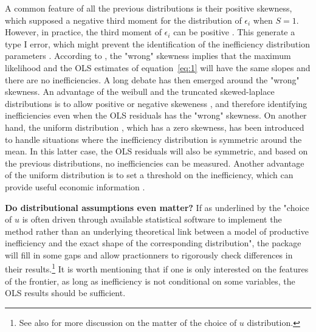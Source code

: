 \documentclass[nojss]{jss}
\begin{document}
A common feature of all the previous distributions is their positive skewness, 
which supposed a negative third moment for the distribution of 
$\epsilon_i$ when $S=1$. However, in practice, the third moment of 
$\epsilon_i$ can be positive \citep{sw09}. This generate a type I error, which 
might prevent the identification of the inefficiency distribution parameters 
\citep{olson80}. According to \citet{wald82}, the "wrong" skewness implies that 
the maximum likelihood and the OLS estimates of equation~\ref{eq:1} will have 
the same slopes and there are no inefficiencies. A long debate has then emerged 
around the "wrong" skewness. An advantage of the weibull and 
the truncated skewed-laplace distributions is to allow positive 
or negative skeweness \citep{tsionas07, wang12}, and therefore identifying inefficiencies even when the OLS
residuals has the "wrong" skewness. On another hand, the uniform distribution 
\citet{li96, nguyen10, lee14}, which has a zero skewness, has been introduced to  
handle situations where the inefficiency distribution is symmetric around the 
mean. In this latter case, the OLS residuals will also be symmetric, and based on 
the previous distributions, no inefficiencies can be measured. Another advantage
of the uniform distribution is to set a threshold on the inefficiency, which can
provide useful economic information \citep{lee14}.

\textbf{Do distributional assumptions even matter?} If as underlined by 
\citet[p.~16]{kum20} the "choice of $u$ is often driven through available statistical 
software to implement the method rather than an underlying theoretical link 
between a model of productive inefficiency and the exact shape of the 
corresponding distribution", the  package will fill in some gaps and 
allow practionners to rigorously check differences in their results.\footnote{See 
also \citet[p.~214-216]{par14} for more discussion on the matter of the choice of $u$ distribution.}
It is worth mentioning that if one is only interested on the features of the 
frontier, as long as inefficiency is not conditional on some variables, the OLS
results should be sufficient.
\end{document}
